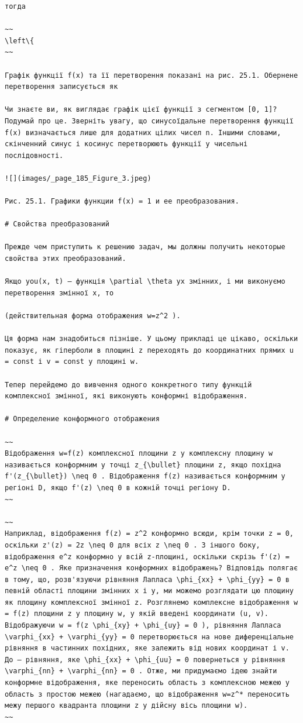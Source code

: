 \documentclass[
  ukrainian,
]{article}
\begin{document}
\begin{verbatim}
тогда

~~
\left\{
~~

Графік функції f(x) та її перетворення показані на рис. 25.1. Обернене перетворення записується як

Чи знаєте ви, як виглядає графік цієї функції з сегментом [0, 1]? Подумай про це. Зверніть увагу, що синусоїдальне перетворення функції f(x) визначається лише для додатних цілих чисел n. Іншими словами, скінченний синус і косинус перетворюють функції у чисельні послідовності.

![](images/_page_185_Figure_3.jpeg)

Рис. 25.1. Графики функции f(x) = 1 и ее преобразования.

# Свойства преобразований

Прежде чем приступить к решению задач, мы должны получить некоторые свойства этих преобразований.

Якщо you(x, t) — функція \partial \theta yx змінних, і ми виконуємо перетворення змінної x, то

(действительная форма отображения w=z^2 ).

Ця форма нам знадобиться пізніше. У цьому прикладі це цікаво, оскільки показує, як гіперболи в площині z переходять до координатних прямих u = const і v = const у площині w.

Тепер перейдемо до вивчення одного конкретного типу функцій комплексної змінної, які виконують конформні відображення.

# Определение конформного отображения

~~
Відображення w=f(z) комплексної площини z у комплексну площину w називається конформним у точці z_{\bullet} площини z, якщо похідна f'(z_{\bullet}) \neq 0 . Відображення f(z) називається конформним у регіоні D, якщо f'(z) \neq 0 в кожній точці регіону D.
~~

~~
Наприклад, відображення f(z) = z^2 конформно всюди, крім точки z = 0, оскільки z'(z) = 2z \neq 0 для всіх z \neq 0 . З іншого боку, відображення e^z конформно у всій z-площині, оскільки скрізь f'(z) = e^z \neq 0 . Яке призначення конформних відображень? Відповідь полягає в тому, що, розв'язуючи рівняння Лапласа \phi_{xx} + \phi_{yy} = 0 в певній області площини змінних x і y, ми можемо розглядати цю площину як площину комплексної змінної z. Розглянемо комплексне відображення w = f(z) площини z у площину w, у якій введені координати (u, v). Відображуючи w = f(z \phi_{xy} + \phi_{uy} = 0 ), рівняння Лапласа \varphi_{xx} + \varphi_{yy} = 0 перетворюється на нове диференціальне рівняння в частинних похідних, яке залежить від нових координат і v. До — рівняння, яке \phi_{xx} + \phi_{uu} = 0 повернеться у рівняння \varphi_{nn} + \varphi_{nn} = 0 . Отже, ми придумаємо ідею знайти конформне відображення, яке переносить область з комплексною межею у область з простою межею (нагадаємо, що відображення w=z^* переносить межу першого квадранта площини z у дійсну вісь площини w).
~~


\end{verbatim}
\end{document}
